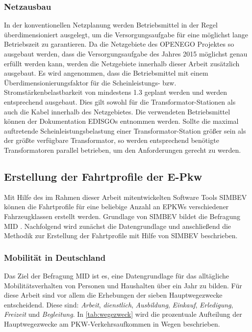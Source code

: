 \subsubsection{Netzausbau}

In der konventionellen Netzplanung werden Betriebsmittel in der Regel überdimensioniert ausgelegt, um die Versorgungsaufgabe für eine möglichst lange Betriebszeit zu garantieren.
Da die Netzgebiete des \gls{OPENEGO} Projektes so ausgebaut werden, dass die Versorgungsaufgabe des Jahres \num{2015} möglichst genau erfüllt werden kann, werden die Netzgebiete innerhalb dieser Arbeit zusätzlich ausgebaut.
Es wird angenommen, dass die Betriebsmittel mit einem Überdimensionierungsfaktor für die Scheinleistungs- bzw. Stromstärkenbelastbarkeit von mindestens \num{1.3} geplant werden und werden entsprechend ausgebaut.
Dies gilt sowohl für die Transformator-Stationen als auch die Kabel innerhalb des Netzgebietes.
Die verwendeten Betriebsmittel können der Dokumentation \glspl{EDISGO} \cite{edisgoDocs2017a} entnommen werden.
Sollte die maximal auftretende Scheinleistungsbelastung einer Transformator-Station größer sein als der größte verfügbare Transformator, so werden entsprechend benötigte Transformatoren parallel betrieben, um den Anforderungen gerecht zu werden.


\subsection{Erstellung der Fahrtprofile der E-Pkw}\label{chap:simbev_theo}

Mit Hilfe des im Rahmen dieser Arbeit mitentwickelten Software Tools \gls{SIMBEV} können die Fahrtprofile für eine beliebige Anzahl an \glspl{EPKW} verschiedener Fahrzeugklassen erstellt werden.
Grundlage von \gls{SIMBEV} bildet die Befragung \gls{MID} \cite{ISGH2017}.
Nachfolgend wird zunächst die Datengrundlage und anschließend die Methodik zur Erstellung der Fahrtprofile mit Hilfe von \gls{SIMBEV} beschrieben.


\subsubsection{Mobilität in Deutschland}\label{chap:MID}

Das Ziel der Befragung \gls{MID} \cite{ISGH2017} ist es, eine Datengrundlage für das alltägliche Mobilitätsverhalten von Personen und Haushalten über ein Jahr zu bilden.
Für diese Arbeit sind vor allem die Erhebungen der sieben Hauptwegezwecke entscheidend.
Diese sind: \textit{Arbeit}, \textit{dienstlich}, \textit{Ausbildung}, \textit{Einkauf}, \textit{Erledigung}, \textit{Freizeit} und \textit{Begleitung}.
In \autoref{tab:wegezweck} wird die prozentuale Aufteilung der Hauptwegezwecke am \gls{PKW}-Verkehrsaufkommen in Wegen beschrieben.

